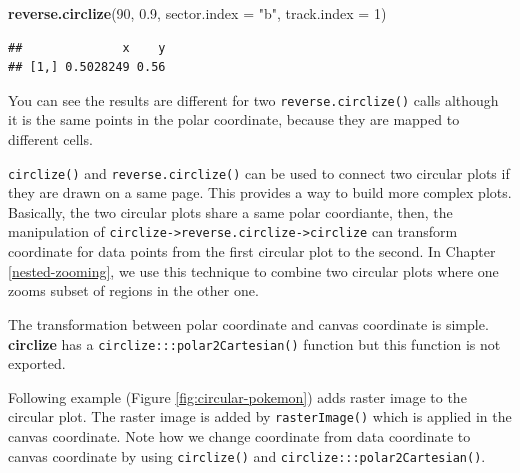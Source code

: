 \documentclass[]{book}
\newenvironment{Shaded}{\begin{snugshade}}{\end{snugshade}}
\newcommand{\KeywordTok}[1]{\textcolor[rgb]{0.13,0.29,0.53}{\textbf{#1}}}
\newcommand{\DataTypeTok}[1]{\textcolor[rgb]{0.13,0.29,0.53}{#1}}
\newcommand{\DecValTok}[1]{\textcolor[rgb]{0.00,0.00,0.81}{#1}}
\newcommand{\FloatTok}[1]{\textcolor[rgb]{0.00,0.00,0.81}{#1}}
\newcommand{\StringTok}[1]{\textcolor[rgb]{0.31,0.60,0.02}{#1}}
\newcommand{\NormalTok}[1]{#1}
\theoremstyle{definition}
\theoremstyle{definition}
\theoremstyle{remark}
\begin{document}
\begin{Shaded}
\begin{Highlighting}[]
\KeywordTok{reverse.circlize}\NormalTok{(}\DecValTok{90}\NormalTok{, }\FloatTok{0.9}\NormalTok{, }\DataTypeTok{sector.index =} \StringTok{"b"}\NormalTok{, }\DataTypeTok{track.index =} \DecValTok{1}\NormalTok{)}
\end{Highlighting}
\end{Shaded}

\begin{verbatim}
##              x    y
## [1,] 0.5028249 0.56
\end{verbatim}

You can see the results are different for two
\texttt{reverse.circlize()} calls although it is the same points in the
polar coordinate, because they are mapped to different cells.

\texttt{circlize()} and \texttt{reverse.circlize()} can be used to
connect two circular plots if they are drawn on a same page. This
provides a way to build more complex plots. Basically, the two circular
plots share a same polar coordiante, then, the manipulation of
\texttt{circlize-\textgreater{}reverse.circlize-\textgreater{}circlize}
can transform coordinate for data points from the first circular plot to
the second. In Chapter \ref{nested-zooming}, we use this technique to
combine two circular plots where one zooms subset of regions in the
other one.

The transformation between polar coordinate and canvas coordinate is
simple. \textbf{circlize} has a \texttt{circlize:::polar2Cartesian()}
function but this function is not exported.

Following example (Figure \ref{fig:circular-pokemon}) adds raster image
to the circular plot. The raster image is added by
\texttt{rasterImage()} which is applied in the canvas coordinate. Note
how we change coordinate from data coordinate to canvas coordinate by
using \texttt{circlize()} and \texttt{circlize:::polar2Cartesian()}.
\end{document}
